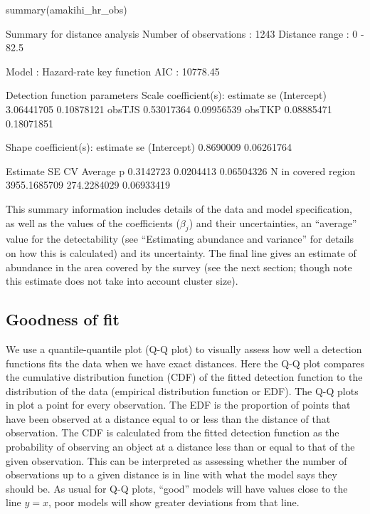 \documentclass[article,shortnames]{jss}
\begin{document}
\begin{CodeChunk}
\begin{CodeInput}
summary(amakihi_hr_obs)
\end{CodeInput}
\begin{CodeOutput}

Summary for distance analysis 
Number of observations :  1243 
Distance range         :  0  -  82.5 

Model : Hazard-rate key function 
AIC   : 10778.45 

Detection function parameters
Scale coefficient(s):  
              estimate         se
(Intercept) 3.06441705 0.10878121
obsTJS      0.53017364 0.09956539
obsTKP      0.08885471 0.18071851

Shape coefficient(s):  
             estimate         se
(Intercept) 0.8690009 0.06261764

                        Estimate          SE         CV
Average p              0.3142723   0.0204413 0.06504326
N in covered region 3955.1685709 274.2284029 0.06933419
\end{CodeOutput}
\end{CodeChunk}

This summary information includes details of the data and model
specification, as well as the values of the coefficients (\(\beta_j\))
and their uncertainties, an ``average'' value for the detectability (see
``Estimating abundance and variance'' for details on how this is
calculated) and its uncertainty. The final line gives an estimate of
abundance in the area covered by the survey (see the next section;
though note this estimate does not take into account cluster size).

\subsection{Goodness of fit}\label{goodness-of-fit}

We use a quantile-quantile plot (Q-Q plot) to visually assess how well a
detection functions fits the data when we have exact distances. Here the
Q-Q plot compares the cumulative distribution function (CDF) of the
fitted detection function to the distribution of the data (empirical
distribution function or EDF). The Q-Q plots in  plot a
point for every observation. The EDF is the proportion of points that
have been observed at a distance equal to or less than the distance of
that observation. The CDF is calculated from the fitted detection
function as the probability of observing an object at a distance less
than or equal to that of the given observation. This can be interpreted
as assessing whether the number of observations up to a given distance
is in line with what the model says they should be. As usual for Q-Q
plots, ``good'' models will have values close to the line \(y=x\), poor
models will show greater deviations from that line.
\end{document}

